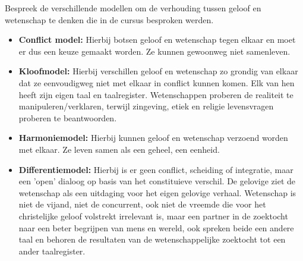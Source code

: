 \documentclass[main.tex]{subfiles}
\begin{document}
\begin{examenvraag}
    \begin{vraag}
        Bespreek de verschillende modellen om de verhouding tussen geloof en wetenschap te denken die in de cursus besproken werden.
    \end{vraag}

    \begin{antwoord}
		\begin{itemize}
			\item \textbf{Conflict model:} Hierbij botsen geloof en wetenschap tegen elkaar en moet er dus een keuze gemaakt worden. Ze kunnen gewoonweg niet samenleven.
			\item \textbf{Kloofmodel:} Hierbij verschillen geloof en wetenschap zo grondig van elkaar dat ze eenvoudigweg niet met elkaar in conflict kunnen komen. Elk van hen heeft zijn eigen taal en taalregister. Wetenschappen proberen de realiteit te manipuleren/verklaren, terwijl zingeving, etiek en religie levensvragen proberen te beantwoorden.
			\item \textbf{Harmoniemodel:} Hierbij kunnen geloof en wetenschap verzoend worden met elkaar. Ze leven samen als een geheel, een eenheid.
			\item \textbf{Differentiemodel:} Hierbij is er geen conflict, scheiding of integratie, maar een 'open' dialoog op basis van het constituieve verschil. De gelovige ziet de wetenschap als een uitdaging voor het eigen gelovige verhaal. Wetenschap is niet de vijand, niet de concurrent, ook niet de vreemde die voor het christelijke geloof volstrekt irrelevant is, maar een partner in de zoektocht naar een beter begrijpen van mens en wereld, ook spreken beide een andere taal en behoren de resultaten van de wetenschappelijke zoektocht tot een ander taalregister.
			 
		\end{itemize}
    \end{antwoord}
\end{examenvraag}
\end{document}
